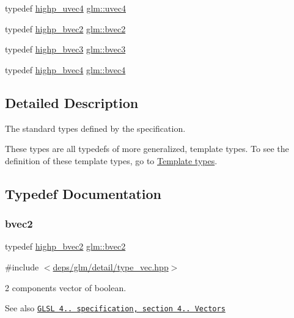 \begin{DoxyCompactItemize}
\item 
typedef \hyperlink{group__core__precision_gae48d6e9a99afc33e6fa51e5d576dfd1a}{highp\+\_\+uvec4} \hyperlink{group__core__types_ga1c426d19627b32b14f0089f7f4ba7b1d}{glm\+::uvec4}
\item 
typedef \hyperlink{group__core__precision_gad8f63e4c7546320f6b72808fadfda3c2}{highp\+\_\+bvec2} \hyperlink{group__core__types_ga7523cf292181cf7daef3aa0a3267d8e3}{glm\+::bvec2}
\item 
typedef \hyperlink{group__core__precision_ga0e3365e13160aa93d2a9c68529a013ce}{highp\+\_\+bvec3} \hyperlink{group__core__types_ga3f07d6d37fc6fe875170fd5799685bcf}{glm\+::bvec3}
\item 
typedef \hyperlink{group__core__precision_gaa99e0301060bf06e7750c1c3591b6b4e}{highp\+\_\+bvec4} \hyperlink{group__core__types_ga6bb211b3d3bebae3867548d5673ca5cd}{glm\+::bvec4}
\end{DoxyCompactItemize}


\subsection{Detailed Description}
The standard types defined by the specification. 

These types are all typedefs of more generalized, template types. To see the definition of these template types, go to \hyperlink{group__core__template}{Template types}. 

\subsection{Typedef Documentation}
\mbox{\label{group__core__types_ga7523cf292181cf7daef3aa0a3267d8e3}} 
\subsubsection{\texorpdfstring{bvec2}{bvec2}}
{\footnotesize\ttfamily typedef \hyperlink{group__core__precision_gad8f63e4c7546320f6b72808fadfda3c2}{highp\+\_\+bvec2} \hyperlink{group__core__types_ga7523cf292181cf7daef3aa0a3267d8e3}{glm\+::bvec2}}



{\ttfamily \#include $<$\hyperlink{type__vec_8hpp}{deps/glm/detail/type\+\_\+vec.\+hpp}$>$}

2 components vector of boolean.

\begin{DoxySeeAlso}{See also}
\href{http://www.opengl.org/registry/doc/GLSLangSpec.4.20.8.pdf}{\tt G\+L\+SL 4.. specification, section 4.. Vectors} 
\end{DoxySeeAlso}


